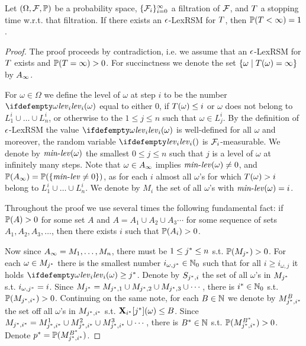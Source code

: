 \begin{theorem}
Let $(\Omega,\mathcal{F},\mathbb{P})$ be a probability space, 
$\{\mathcal{F}_i\}_{i=0}^{\infty}$ a filtration of $\mathcal{F}$, and $T$ a 
stopping 
time w.r.t. that filtration. If there exists an $\epsilon$-LexRSM for $T$, 
then $\mathbb{P}(T<\infty)=1$.
\end{theorem}
\begin{proof}
The proof proceeds by contradiction, i.e. we assume that an $\epsilon$-LexRSM for 
$T$ exists and $\mathbb{P}(T=\infty)>0$. For succinctness we denote the 
set $\{\omega\mid T(\omega)=\infty\}$ by $A_{\infty}$.

For $\omega\in \Omega$ we define the level of $\omega$ at step $i$ to be the 
number $\levelrank{\omega}{i}$ equal to either $0$, if $T(\omega)\leq i$ or $\omega$ does not belong to $L^i_1 \cup \dots\cup L^i_n$, 
or otherwise to the $1\leq j \leq n$ such that $\omega\in L^i_j$. By the definition of 
$\epsilon$-LexRSM the value $\levelrank{\omega}{i}$ is well-defined for all 
$\omega$ and moreover, the random variable $\levelrank{}{i}$ is $\mathcal{F}_i$-measurable. We denote by $\mathit{min}\text{-}\mathit{lev}(\omega)$ the smallest $0 \leq j \leq n$ such 
that $j$ is a level of $\omega$ at infinitely many steps. Note that $\omega \in 
A_{\infty}$ implies $\mathit{min}\text{-}\mathit{lev}(\omega)\neq 0$, and $\mathbb{P}(A_{\infty})=\mathbb{P}(\{\mathit{min}\text{-}\mathit{lev} \neq 0 \})$, as for each $i$ almost all $\omega$'s for which $T(\omega)>i$ belong to $L^i_1 \cup \dots\cup L^i_n$. We denote by $M_i$ 
the set of all $\omega$'s with $\mathit{min}\text{-}\mathit{lev}(\omega)=i$.

Throughout the proof we use several times the following fundamental fact: if 
$\mathbb{P}(A)>0$ for some set $A$ and $A=A_1\cup A_2 \cup A_3\cdots$ for some 
sequence of sets $A_1,A_2,A_3,\dots$, then there exists $i$ such that 
$\mathbb{P}(A_i)>0$.

Now since $A_{\infty}=M_1,\dots,M_n$, there must be $1\leq {j}^* \leq n$ 
s.t. $\mathbb{P}(M_{{j}^*})>0$. For each $\omega\in M_{{j}^*}$ there is the smallest number
${i}_{\omega,{j}^*}\in\mathbb{N}_0$ such that for all $i\geq {i}_{\omega,{j}}$ it holds 
$\levelrank{\omega}{i}\geq \fixn{j}$. Denote by $S_{{j}^*,{i}}$ the set of all $\omega$'s in $M_{{j}^*}$ s.t. 
$i_{\omega,{j}^*}={i}$. 
Since $M_{{j}^*} = M_{{j}^*,1} \cup M_{{j}^*,2} \cup M_{{j}^*,3} \cup \cdots$, there is ${i}^*\in 
\mathbb{N}_0$ 
s.t. 
$\mathbb{P}(M_{{j}^*,{i}^*})>0$. Continuing on the same note, for each $B\in \mathbb{N}$ we 
denote by $M_{{j}^*,{i}^*}^{B}$ the set off all $\omega$'s in $M_{{j}^*,{i}^*}$ s.t. 
$\mathbf{X}_{{i}^*}[{j}^*](\omega)\leq B$. Since $M_{{j}^*,{i}^*}= M_{{j}^*,{i}^*}^{1} \cup M_{{j}^*,{i}^*}^{2} 
\cup M_{{j}^*,{i}^*}^{3} \cup \cdots  $, there is ${B}^*\in \mathbb{N}$ s.t. 
$\mathbb{P}(M_{{j}^*,{i}^*}^{{B}^*})>0$. Denote ${p}^*=\mathbb{P}(M_{{j}^*,{i}^*}^{{B}^*})$.


\end{proof}
